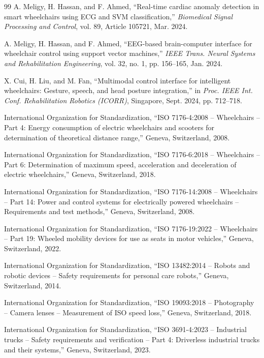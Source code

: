 \documentclass[12pt,a4paper]{report}
\begin{document}
\begin{singlespace}
\begin{thebibliography}{99}
A. Meligy, H. Hassan, and F. Ahmed, ``Real-time cardiac anomaly detection in smart wheelchairs using ECG and SVM classification,'' \textit{Biomedical Signal Processing and Control}, vol. 89, Article 105721, Mar. 2024.

A. Meligy, H. Hassan, and F. Ahmed, ``EEG-based brain-computer interface for wheelchair control using support vector machines,'' \textit{IEEE Trans. Neural Systems and Rehabilitation Engineering}, vol. 32, no. 1, pp. 156--165, Jan. 2024.

X. Cui, H. Liu, and M. Fan, ``Multimodal control interface for intelligent wheelchairs: Gesture, speech, and head posture integration,'' in \textit{Proc. IEEE Int. Conf. Rehabilitation Robotics (ICORR)}, Singapore, Sept. 2024, pp. 712--718.

International Organization for Standardization, ``ISO 7176-4:2008 -- Wheelchairs -- Part 4: Energy consumption of electric wheelchairs and scooters for determination of theoretical distance range,'' Geneva, Switzerland, 2008.

International Organization for Standardization, ``ISO 7176-6:2018 -- Wheelchairs -- Part 6: Determination of maximum speed, acceleration and deceleration of electric wheelchairs,'' Geneva, Switzerland, 2018.

International Organization for Standardization, ``ISO 7176-14:2008 -- Wheelchairs -- Part 14: Power and control systems for electrically powered wheelchairs -- Requirements and test methods,'' Geneva, Switzerland, 2008.

International Organization for Standardization, ``ISO 7176-19:2022 -- Wheelchairs -- Part 19: Wheeled mobility devices for use as seats in motor vehicles,'' Geneva, Switzerland, 2022.

International Organization for Standardization, ``ISO 13482:2014 -- Robots and robotic devices -- Safety requirements for personal care robots,'' Geneva, Switzerland, 2014.

International Organization for Standardization, ``ISO 19093:2018 -- Photography -- Camera lenses -- Measurement of ISO speed loss,'' Geneva, Switzerland, 2018.

International Organization for Standardization, ``ISO 3691-4:2023 -- Industrial trucks -- Safety requirements and verification -- Part 4: Driverless industrial trucks and their systems,'' Geneva, Switzerland, 2023.



\end{thebibliography}
\end{singlespace}
\end{document}
